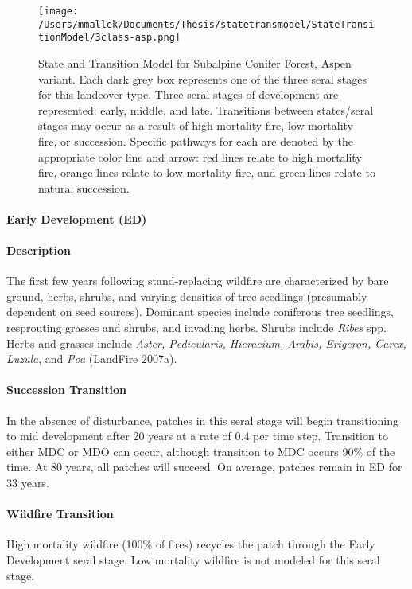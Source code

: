 \begin{figure}[htbp]
\centering
\texttt{[image: /Users/mmallek/Documents/Thesis/statetransmodel/StateTransitionModel/3class-asp.png]}
\caption{State and Transition Model for Subalpine Conifer Forest, Aspen variant. Each dark grey box represents one of the three seral stages for this landcover type. Three seral stages of development are represented: early, middle, and late. Transitions between states/seral stages may occur as a result of high mortality fire, low mortality fire, or succession. Specific pathways for each are denoted by the appropriate color line and arrow: red lines relate to high mortality fire, orange lines relate to low mortality fire, and green lines relate to natural succession.} 
\label{transmodel_scn-asp}
\end{figure}

\paragraph{Early Development (ED)}

\paragraph{Description} The first few years following stand-replacing wildfire are characterized by bare ground, herbs, shrubs, and varying densities of tree seedlings (presumably dependent on seed sources). Dominant species include coniferous tree seedlings, resprouting grasses and shrubs, and invading herbs. Shrubs include \emph{Ribes} spp. Herbs and grasses include \emph{Aster, Pedicularis, Hieracium, Arabis, Erigeron, Carex, Luzula}, and \emph{Poa} (LandFire 2007a).

\paragraph{Succession Transition} In the absence of disturbance, patches in this seral stage will begin transitioning to mid development after 20 years at a rate of 0.4 per time step. Transition to either MDC or MDO can occur, although transition to MDC occurs 90\% of the time. At 80 years, all patches will succeed. On average, patches remain in ED for 33 years.

\paragraph{Wildfire Transition} High mortality wildfire (100\% of fires) recycles the patch through the Early Development seral stage. Low mortality wildfire is not modeled for this seral stage.

